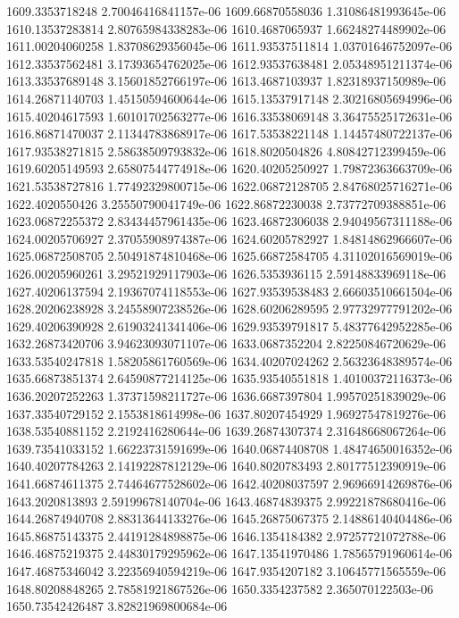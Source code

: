 {1609.3353718248 2.70046416841157e-06
1609.66870558036 1.31086481993645e-06
1610.13537283814 2.80765984338283e-06
1610.4687065937 1.66248274489902e-06
1611.00204060258 1.83708629356045e-06
1611.93537511814 1.03701646752097e-06
1612.33537562481 3.17393654762025e-06
1612.93537638481 2.05348951211374e-06
1613.33537689148 3.15601852766197e-06
1613.4687103937 1.82318937150989e-06
1614.26871140703 1.45150594600644e-06
1615.13537917148 2.30216805694996e-06
1615.40204617593 1.60101702563277e-06
1616.33538069148 3.36475525172631e-06
1616.86871470037 2.11344783868917e-06
1617.53538221148 1.14457480722137e-06
1617.93538271815 2.58638509793832e-06
1618.8020504826 4.80842712399459e-06
1619.60205149593 2.65807544774918e-06
1620.40205250927 1.79872363663709e-06
1621.53538727816 1.77492329800715e-06
1622.06872128705 2.84768025716271e-06
1622.4020550426 3.25550790041749e-06
1622.86872230038 2.73772709388851e-06
1623.06872255372 2.83434457961435e-06
1623.46872306038 2.94049567311188e-06
1624.00205706927 2.37055908974387e-06
1624.60205782927 1.84814862966607e-06
1625.06872508705 2.50491874810468e-06
1625.66872584705 4.31102016569019e-06
1626.00205960261 3.29521929117903e-06
1626.5353936115 2.59148833969118e-06
1627.40206137594 2.19367074118553e-06
1627.93539538483 2.66603510661504e-06
1628.20206238928 3.24558907238526e-06
1628.60206289595 2.97732977791202e-06
1629.40206390928 2.61903241341406e-06
1629.93539791817 5.48377642952285e-06
1632.26873420706 3.94623093071107e-06
1633.0687352204 2.82250846720629e-06
1633.53540247818 1.58205861760569e-06
1634.40207024262 2.56323648389574e-06
1635.66873851374 2.64590877214125e-06
1635.93540551818 1.40100372116373e-06
1636.20207252263 1.37371598211727e-06
1636.6687397804 1.99570251839029e-06
1637.33540729152 2.1553818614998e-06
1637.80207454929 1.96927547819276e-06
1638.53540881152 2.2192416280644e-06
1639.26874307374 2.31648668067264e-06
1639.73541033152 1.66223731591699e-06
1640.06874408708 1.48474650016352e-06
1640.40207784263 2.14192287812129e-06
1640.8020783493 2.80177512390919e-06
1641.66874611375 2.74464677528602e-06
1642.40208037597 2.96966914269876e-06
1643.2020813893 2.59199678140704e-06
1643.46874839375 2.99221878680416e-06
1644.26874940708 2.88313644133276e-06
1645.26875067375 2.14886140404486e-06
1645.86875143375 2.44191284898875e-06
1646.1354184382 2.97257721072788e-06
1646.46875219375 2.44830179295962e-06
1647.13541970486 1.78565791960614e-06
1647.46875346042 3.22356940594219e-06
1647.9354207182 3.10645771565559e-06
1648.80208848265 2.78581921867526e-06
1650.3354237582 2.365070122503e-06
1650.73542426487 3.82821969800684e-06
}

